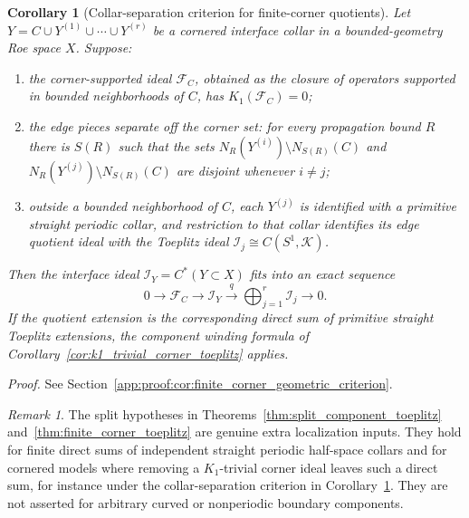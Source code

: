 \documentclass[11pt]{article}
\numberwithin{equation}{section}
\newtheorem{corollary}[theorem]{Corollary}
\theoremstyle{definition}
\theoremstyle{remark}
\newtheorem{remark}[theorem]{Remark}
\newcommand{\proofref}[1]{%
  \par\noindent\emph{Proof.} See Section~\ref{#1}.\par\medskip
}
\newcommand{\proofappendixref}[1]{\proofref{#1}}
\begin{document}
\begin{corollary}[Collar-separation criterion for finite-corner quotients]\label{cor:finite_corner_geometric_criterion}
Let \(Y=C\cup Y^{(1)}\cup\cdots\cup Y^{(r)}\) be a cornered interface collar in a bounded-geometry
Roe space \(X\). Suppose:
\begin{enumerate}[label=(\roman*),leftmargin=2em]
\item the corner-supported ideal \(\mathcal F_C\), obtained as the closure of operators supported
  in bounded neighborhoods of \(C\), has \(K_1(\mathcal F_C)=0\);
\item the edge pieces separate off the corner set: for every propagation bound \(R\) there is
  \(S(R)\) such that the sets
  \(N_R(Y^{(i)})\setminus N_{S(R)}(C)\) and
  \(N_R(Y^{(j)})\setminus N_{S(R)}(C)\) are disjoint whenever \(i\ne j\);
\item outside a bounded neighborhood of \(C\), each \(Y^{(j)}\) is identified with a primitive
  straight periodic collar, and restriction to that collar identifies its edge quotient ideal with
  the Toeplitz ideal \(\mathcal I_j\cong C(S^1,\mathcal K)\).
\end{enumerate}
Then the interface ideal \(\mathcal I_Y=C^*(Y\subset X)\) fits into an exact sequence
\[
0\longrightarrow\mathcal F_C\longrightarrow\mathcal I_Y
\xrightarrow{\;q\;}
\bigoplus_{j=1}^r\mathcal I_j\longrightarrow0.
\]
If the quotient extension is the corresponding direct sum of primitive straight Toeplitz
extensions, the component winding formula of Corollary~\ref{cor:k1_trivial_corner_toeplitz}
applies.
\end{corollary}
\proofappendixref{app:proof:cor:finite_corner_geometric_criterion}




\begin{remark}
The split hypotheses in Theorems~\ref{thm:split_component_toeplitz}
and~\ref{thm:finite_corner_toeplitz} are genuine extra localization inputs. They hold for finite
direct sums of independent straight periodic half-space collars and for cornered models where
removing a \(K_1\)-trivial corner ideal leaves such a direct sum, for instance under the
collar-separation criterion in Corollary~\ref{cor:finite_corner_geometric_criterion}. They are not
asserted for arbitrary curved or nonperiodic boundary components.
\end{remark}
\end{document}
